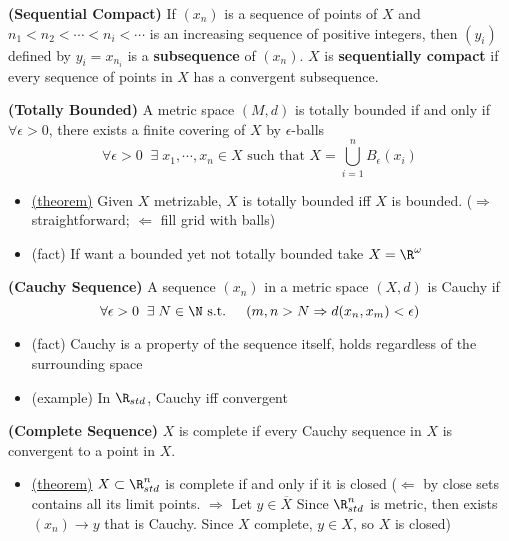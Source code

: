 \documentclass[10.5pt]{article}
\begin{document}
\begin{defn*}
    \textbf{(Sequential Compact)} If $(x_n)$ is a sequence of points of $X$ and $n_1 < n_2 < \cdots < n_i < \cdots$ is an increasing sequence of positive integers, then $(y_i)$ defined by $y_i = x_{n_i}$ is a \textbf{subsequence} of $(x_n)$. $X$ is \textbf{sequentially compact} if every sequence of points in $X$ has a convergent subsequence.
\end{defn*}

\begin{defn*}
    \textbf{(Totally Bounded)}
    A metric space $(M,d)$ is totally bounded if and only if $\forall \epsilon>0$, there exists a finite covering of $X$ by $\epsilon$-balls
    \[
        \forall \epsilon > 0 \;\; \exists \; x_1, \cdots, x_n \in X \text{ such that } X = \bigcup_{i=1}^n B_{\epsilon}(x_i)
    \]
    \begin{itemize}
        \item \underline{(theorem)} Given $X$ metrizable, $X$ is totally bounded iff $X$ is bounded. ($\Rightarrow$ straightforward; $\Leftarrow$ fill grid with balls)
        \item (fact) If want a bounded yet not totally bounded take $X = \R^{\omega}$
    \end{itemize}
\end{defn*}

\begin{defn*}
    \textbf{(Cauchy Sequence)} A sequence $(x_n)$ in a metric space $(X,d)$ is Cauchy if 
    \[
        \forall \epsilon > 0 \;\; \exists \; N\in \N \text{ s.t. } 
        \quad 
        (m,n>N \Rightarrow d(x_n, x_m) < \epsilon)
    \]
    \begin{itemize}
        \item (fact) Cauchy is a property of the sequence itself, holds regardless of the surrounding space
        \item (example) In $\R_{std}$, Cauchy iff convergent
    \end{itemize}
\end{defn*}

\begin{defn*}
    \textbf{(Complete Sequence)} $X$ is complete if every Cauchy sequence in $X$ is convergent to a point in $X$.
    \begin{itemize}
        \item \underline{(theorem)} $X\subset \R^n_{std}$ is complete if and only if it is closed ($\Leftarrow$ by close sets contains all its limit points. $\Rightarrow$ Let $y\in \overline{X}$ Since $\R^n_{std}$ is metric, then exists $(x_n) \to y$ that is Cauchy. Since $X$ complete, $y\in X$, so $X$ is closed)
    \end{itemize}
\end{defn*}
\end{document}
